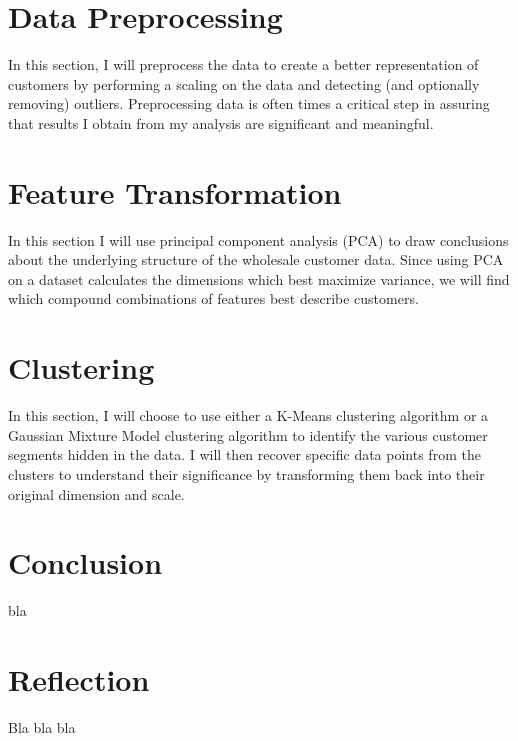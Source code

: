 \documentclass[a4paper]{article}
\begin{document}
\section{Data Preprocessing}
\label{sec:data_preprocessing}
In this section, I will preprocess the data to create a better representation of customers by performing a scaling on the data and detecting (and optionally removing) outliers. Preprocessing data is often times a critical step in assuring that results I obtain from my analysis are significant and meaningful.


\section{Feature Transformation}
\label{sec:feature_transformation}
In this section I will use principal component analysis (PCA) to draw conclusions about the underlying structure of the wholesale customer data. Since using PCA on a dataset calculates the dimensions which best maximize variance, we will find which compound combinations of features best describe customers.



\section{Clustering}
\label{sec:clustering}
In this section, I will choose to use either a K-Means clustering algorithm or a Gaussian Mixture Model clustering algorithm to identify the various customer segments hidden in the data. I will then recover specific data points from the clusters to understand their significance by transforming them back into their original dimension and scale.



\section{Conclusion}
\label{sec:conclusion}
bla


\section{Reflection}
\label{sec:reflection}
Bla bla bla






\end{document}
